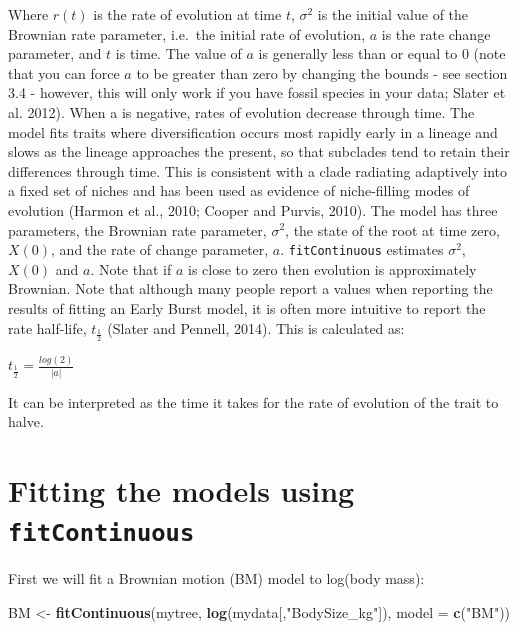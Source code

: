 \documentclass[]{book}
\newenvironment{Shaded}{\begin{snugshade}}{\end{snugshade}}
\newcommand{\KeywordTok}[1]{\textcolor[rgb]{0.13,0.29,0.53}{\textbf{{#1}}}}
\newcommand{\DataTypeTok}[1]{\textcolor[rgb]{0.13,0.29,0.53}{{#1}}}
\newcommand{\StringTok}[1]{\textcolor[rgb]{0.31,0.60,0.02}{{#1}}}
\newcommand{\NormalTok}[1]{{#1}}
\theoremstyle{definition}
\theoremstyle{definition}
\theoremstyle{definition}
\theoremstyle{remark}
\begin{document}
Where \(r(t)\) is the rate of evolution at time \(t\), \(\sigma^2\) is
the initial value of the Brownian rate parameter, i.e.~the initial rate
of evolution, \(a\) is the rate change parameter, and \(t\) is time. The
value of \(a\) is generally less than or equal to 0 (note that you can
force \(a\) to be greater than zero by changing the bounds - see section
3.4 - however, this will only work if you have fossil species in your
data; Slater et al. 2012). When a is negative, rates of evolution
decrease through time. The model fits traits where diversification
occurs most rapidly early in a lineage and slows as the lineage
approaches the present, so that subclades tend to retain their
differences through time. This is consistent with a clade radiating
adaptively into a fixed set of niches and has been used as evidence of
niche-filling modes of evolution (Harmon et al., 2010; Cooper and
Purvis, 2010). The model has three parameters, the Brownian rate
parameter, \(\sigma^2\), the state of the root at time zero, \(X(0)\),
and the rate of change parameter, \(a\). \texttt{fitContinuous}
estimates \(\sigma^2\), \(X(0)\) and \(a\). Note that if \(a\) is close
to zero then evolution is approximately Brownian. Note that although
many people report a values when reporting the results of fitting an
Early Burst model, it is often more intuitive to report the rate
half-life, \(t_{\frac{1}{2}}\) (Slater and Pennell, 2014). This is
calculated as:

\(t_{\frac{1}{2}} = \frac{log(2)}{|a|}\)

It can be interpreted as the time it takes for the rate of evolution of
the trait to halve.

\section{\texorpdfstring{Fitting the models using
\texttt{fitContinuous}}{Fitting the models using fitContinuous}}\label{fitting-the-models-using-fitcontinuous}

First we will fit a Brownian motion (BM) model to log(body mass):

\begin{Shaded}
\begin{Highlighting}[]
\NormalTok{BM <-}\StringTok{ }\KeywordTok{fitContinuous}\NormalTok{(mytree, }\KeywordTok{log}\NormalTok{(mydata[,}\StringTok{"BodySize_kg"}\NormalTok{]), }\DataTypeTok{model =} \KeywordTok{c}\NormalTok{(}\StringTok{"BM"}\NormalTok{))}
\end{Highlighting}
\end{Shaded}
\end{document}
